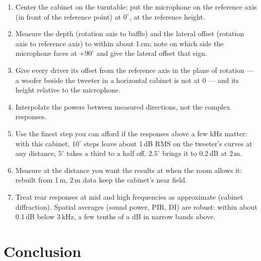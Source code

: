 \documentclass[11pt,a4paper]{article}
\begin{document}
\begin{tcolorbox}[colback=gray!4,colframe=gray!45,title=Checklist for a small-turntable polar measurement,fonttitle=\bfseries\small,fontupper=\small]
\begin{enumerate}
  \item Center the cabinet on the turntable; put the microphone on the reference axis (in front of the
  reference point) at $0^\circ$, at the reference height.
  \item Measure the depth (rotation axis to baffle) and the lateral offset (rotation axis to reference
  axis) to within about 1\,cm; note on which side the microphone faces at $+90^\circ$ and give the
  lateral offset that sign.
  \item Give every driver its offset from the reference axis in the plane of rotation --- a woofer
  beside the tweeter in a horizontal cabinet is not at 0 --- and its height relative to the microphone.
  \item Interpolate the powers between measured directions, not the complex responses.
  \item Use the finest step you can afford if the responses above a few kHz matter: with this cabinet,
  $10^\circ$ steps leave about 1\,dB RMS on the tweeter's curves at any distance, $5^\circ$ takes a third to a
  half off, $2.5^\circ$ brings it to 0.2\,dB at 2\,m.
  \item Measure at the distance you want the results at when the room allows it: rebuilt from 1\,m, 2\,m
  data keep the cabinet's near field.
  \item Treat rear responses at mid and high frequencies as approximate (cabinet diffraction). Spatial
  averages (sound power, PIR, DI) are robust: within about 0.1\,dB below 3\,kHz, a few tenths of a dB
  in narrow bands above.
\end{enumerate}
\end{tcolorbox}

\section{Conclusion}
\end{document}
